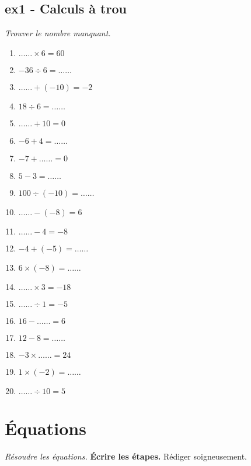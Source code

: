 \documentclass[12pt]{article}
\begin{document}
\subsection*{ex1 - Calculs  à trou}
\textit{Trouver le nombre manquant.}

  \begin{multicols}{3}\noindent
    \begin{enumerate}
    \item $\ldots\ldots \times 6 = 60$
    \item $-36 \div 6 = \ldots\ldots$
    \item $\ldots\ldots + \left( -10\right) = -2$
    \item $18 \div 6 = \ldots\ldots$
    \item $\ldots\ldots + 10 = 0$
    \item $-6 + 4 = \ldots\ldots$
    \item $-7 + \ldots\ldots = 0$
    \item $5 - 3 = \ldots\ldots$
    \item $100 \div \left( -10\right) = \ldots\ldots$
    \item $\ldots\ldots - \left( -8\right) = 6$
    \item $\ldots\ldots - 4 = -8$
    \item $-4 + \left( -5\right) = \ldots\ldots$
    \item $6 \times \left( -8\right) = \ldots\ldots$
    \item $\ldots\ldots \times 3 = -18$
    \item $\ldots\ldots \div 1 = -5$
    \item $16 - \ldots\ldots = 6$
    \item $12 - 8 = \ldots\ldots$
    \item $-3 \times \ldots\ldots = 24$
    \item $1 \times \left( -2\right) = \ldots\ldots$
    \item $\ldots\ldots \div 10 = 5$
    \end{enumerate}
  \end{multicols}

    \section*{Équations}
  \textit{Résoudre les équations.} \textbf{Écrire les étapes.} Rédiger soigneusement.
\end{document}
